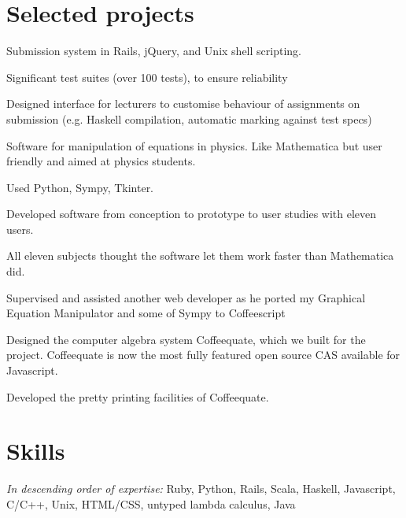 \documentclass[letterpaper]{resume}
\begin{document}
\section{Selected projects}

\begin{compactitem}
\item Submission system in Rails, jQuery, and Unix shell scripting.
\item Significant test suites (over 100 tests), to ensure reliability
\item Designed interface for lecturers to customise behaviour of assignments on submission (e.g. Haskell compilation, automatic marking against test specs)
\end{compactitem}

\begin{compactitem}
\item Software for manipulation of equations in physics. Like Mathematica but user friendly and aimed at physics students.
\item Used Python, Sympy, Tkinter.
\item Developed software from conception to prototype to user studies with eleven users.
\item All eleven subjects thought the software let them work faster than Mathematica did.
\end{compactitem}

\begin{compactitem}
\item Supervised and assisted another web developer as he ported my Graphical Equation Manipulator and some of Sympy to Coffeescript
\item Designed the computer algebra system Coffeequate, which we built for the project. Coffeequate is now the most fully featured open source CAS available for Javascript.
\item Developed the pretty printing facilities of Coffeequate.
\end{compactitem}

\section{Skills}

\textit{In descending order of expertise:} Ruby, Python, Rails, Scala, Haskell, Javascript, C/C++, Unix, HTML/CSS, untyped lambda calculus, Java
\end{document}
